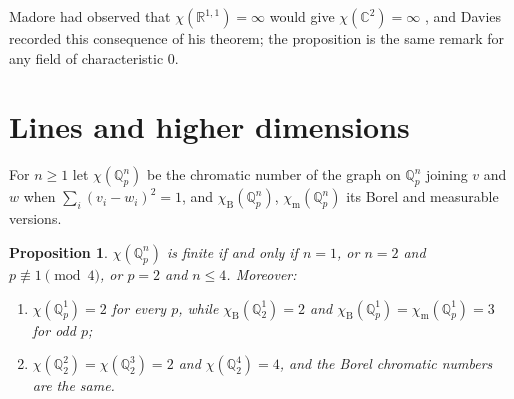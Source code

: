 \documentclass[11pt,a4paper]{amsart}
\newtheorem{proposition}[theorem]{Proposition}
\theoremstyle{remark}
\newcommand{\Q}{\mathbb{Q}}
\newcommand{\R}{\mathbb{R}}
\newcommand{\C}{\mathbb{C}}
\newcommand{\chiB}{\chi_{\mathrm{B}}}
\newcommand{\chiM}{\chi_{\mathrm{m}}}
\begin{document}
Madore had observed that $\chi(\R^{1,1})=\infty$ would give $\chi(\C^2)=\infty$ \cite[\P6.4]{Madore}, and Davies
recorded this consequence of his theorem; the proposition is the same remark for any field of characteristic
$0$.

\section{Lines and higher dimensions}\label{sec:dim}

For $n\ge1$ let $\chi(\Q_p^n)$ be the chromatic number of the graph on $\Q_p^n$ joining $v$ and $w$ when
$\sum_i(v_i-w_i)^2=1$, and $\chiB(\Q_p^n)$, $\chiM(\Q_p^n)$ its Borel and measurable versions.

\begin{proposition}\label{prop:dim}
$\chi(\Q_p^n)$ is finite if and only if $n=1$, or $n=2$ and $p\not\equiv1\pmod4$, or $p=2$ and $n\le4$. Moreover:
\begin{enumerate}
\item $\chi(\Q_p^1)=2$ for every $p$, while $\chiB(\Q_2^1)=2$ and $\chiB(\Q_p^1)=\chiM(\Q_p^1)=3$ for odd $p$;
\item $\chi(\Q_2^2)=\chi(\Q_2^3)=2$ and $\chi(\Q_2^4)=4$, and the Borel chromatic numbers are the same.
\end{enumerate}
\end{proposition}
\end{document}
